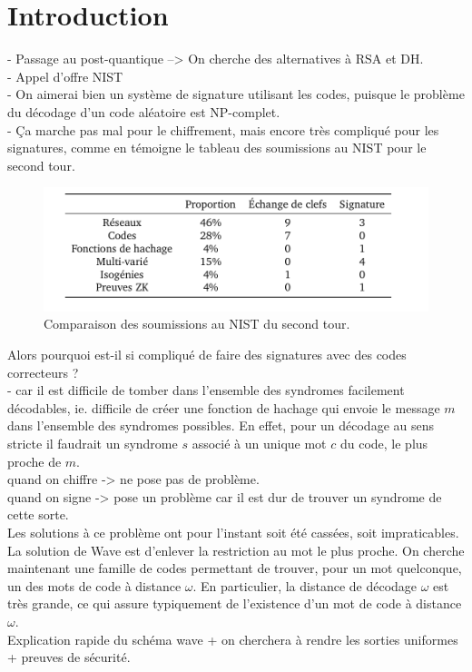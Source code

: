 \documentclass[12pt]{article}
\theoremstyle{plain}
\begin{document}
\newpage
\tableofcontents
\newpage

\section*{Introduction}

- Passage au post-quantique --> On cherche des alternatives à RSA et DH.\\
- Appel d'offre NIST \\
- On aimerai bien un système de signature utilisant les codes, puisque le problème du décodage d'un code aléatoire est NP-complet. \\
- Ça marche pas mal pour le chiffrement, mais encore très compliqué pour les signatures, comme en témoigne le tableau des soumissions au NIST pour le second tour. \\

\begin{figure}[h]
\label{nist 2}
\begin{center}
\includegraphics [scale=0.4]{include/nist_second_tour.png}
\end{center}
\caption{\small Comparaison des soumissions au NIST du second tour.}
\end{figure}
\noindent Alors pourquoi est-il si compliqué de faire des signatures avec des codes correcteurs ? \\
- car il est difficile de tomber dans l'ensemble des syndromes facilement décodables, ie. difficile de créer une fonction de hachage qui envoie le message $m$ dans l'ensemble des syndromes possibles. En effet, pour un décodage au sens stricte il faudrait un syndrome $s$ associé à un unique mot $c$ du code, le plus proche de $m$.\\
quand on chiffre -> ne pose pas de problème. \\
quand on signe -> pose un problème car il est dur de trouver un syndrome de cette sorte. \\
Les solutions à ce problème ont pour l'instant soit été cassées, soit impraticables.\\
La solution de Wave est d'enlever la restriction au mot le plus proche. On cherche maintenant une famille de codes permettant de trouver, pour un mot quelconque, un des mots de code à distance $\omega$. En particulier, la distance de décodage $\omega$ est très grande, ce qui assure typiquement de l’existence d’un mot de code à distance $\omega$.\\
Explication rapide du schéma wave + on cherchera à rendre les sorties uniformes + preuves de sécurité. \\
\end{document}
